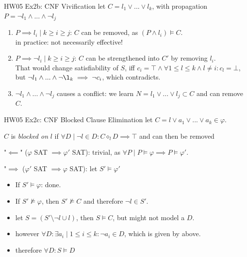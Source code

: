 \documentclass[fleqn,11pt,aspectratio=169]{beamer}
\begin{document}
\begin{frame}{HW05 Ex2b: CNF Vivification}
	let $C = l_1 \lor ... \lor l_k$, with propagation $P = \neg l_1 \land ... \land \neg l_j$
	\begin{enumerate}
		\item $P \implies l_i \mid k \geq i \ge j$: $C$ can be removed, as $(P\land l_i) \models C$. \\ 
				in practice: not necessarily effective!
		\item $P \implies \neg l_i \mid k \geq i \ge j$: $C$ can be strengthened into $C'$ by removing $l_i$.\\
		That would change satisfiability of $S$, iff $c_i = \top \land \forall 1\leq l \leq k \land l\neq i: c_l = \bot$, but $\neg l_1 \land ... \land \neg \l_k \implies \neg c_i$, which contradicts.
		\item $\neg l_1 \land ... \land \neg l_j$ causes a conflict: we learn $N = l_1 \lor ... \lor l_j \subset C$ and can remove $C$.
	\end{enumerate}
\end{frame}

\begin{frame}{HW05 Ex2c: CNF Blocked Clause Elimination}
	let $C = l \lor a_1 \lor ... \lor a_k \in \varphi$. 
	
	$C$ is  \textit{blocked on} $l$ if $\forall D \mid \neg l \in D: C \diamond_l D \implies \top$ and can then be removed
	
	"$\impliedby$" ($\varphi$ SAT $\implies \varphi'$ SAT): trivial, as $\forall P \mid P \models \varphi \implies P \models \varphi'$. 
	
	"$\implies$ ($\varphi'$ SAT $\implies \varphi$ SAT): let $S'\models \varphi'$
	\begin{itemize}
		\item If $S' \models \varphi$: done.
		\item If $S' \not\models \varphi$, then $S' \not\models C$ and therefore $\neg l \in S'$. 
		\item let $S=(S'\setminus {\neg l} \cup {l})$, then $S \models C$, but might not model a $D$. 
		\item however $\forall D: \exists a_i \mid 1\leq i \leq k: \neg a_i \in D$, which is given by above. 
		\item therefore $\forall D: S \models D$ 
	\end{itemize}
\end{frame}
\end{document}
